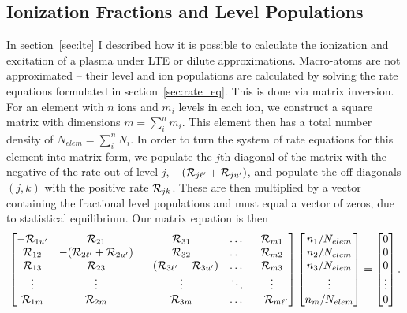 



\subsection{Ionization Fractions and Level Populations}
\label{sec:matom_pops}
In section~\ref{sec:lte} I described how it is possible to calculate the
ionization and excitation of a plasma under LTE or dilute approximations.
Macro-atoms are not approximated -- their level and ion populations are 
calculated by solving the rate equations formulated in section~\ref{sec:rate_eq}. 
This is done via matrix inversion. For an element with $n$ ions and $m_i$
levels in each ion, we construct a square matrix with dimensions 
$m = \sum_i^n m_i$.
This element then has a total number density of $N_{elem} = \sum_i^n N_i$.
In order to turn the system of rate equations for this element into matrix form, we
populate the $j$th diagonal of the matrix with the negative of the rate out of
level $j$, $-({\cal R}_{j{\ell^\prime}} + {\cal R}_{j{u^\prime}})$, 
and populate the off-diagonals $(j,k)$ with the positive rate 
${\cal R}_{jk}$. These are then multiplied by a vector containing the fractional level
populations and must equal a vector of zeros, due to statistical equilibrium.
Our matrix equation is then
%
\begin{equation}
\begin{bmatrix}
    -{\cal R}_{1{u^\prime}} & {\cal R}_{21} & {\cal R}_{31} & \dots & {\cal R}_{m1} \\
    {\cal R}_{12} & -({\cal R}_{2{\ell^\prime}} + {\cal R}_{2{u^\prime}}) & {\cal R}_{32} & \dots & {\cal R}_{m2} \\
    {\cal R}_{13}  & {\cal R}_{23} & -({\cal R}_{3{\ell^\prime}} + {\cal R}_{3{u^\prime}}) & \dots & {\cal R}_{m3} \\
    \vdots & \vdots & \vdots & \ddots & \vdots \\
    {\cal R}_{1m}      & {\cal R}_{2m} & {\cal R}_{3m} & \dots & -{\cal R}_{m{\ell^\prime}}
\end{bmatrix}
\begin{bmatrix}
    n_1 / N_{elem} \\
    n_2 / N_{elem} \\
    n_3 / N_{elem} \\
    \vdots         \\
    n_m / N_{elem} 
\end{bmatrix}
=
\begin{bmatrix}
    0 \\
    0 \\
    0 \\
    \vdots \\
    0
\end{bmatrix}
.
\end{equation}
